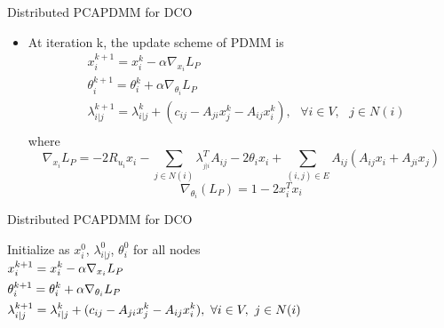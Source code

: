 \documentclass{beamer}
\begin{document}
\begin{frame}{Distributed PCA}{PDMM for DCO}
\begin{itemize}
\item{
At iteration k, the update scheme of PDMM is
\begin{equation}
\begin{align}
  & x_{i}^{k+1}=x_{i}^{k}-\alpha {{\nabla }_{{{x}_{i}}}}{{L}_{P}} \\ 
 & \theta _{i}^{k+1}=\theta _{i}^{k}+\alpha {{\nabla }_{{{\theta }_{i}}}}{{L}_{P}} \\ 
 & \lambda _{i|j}^{k+1}=\lambda _{i|j}^{k}+({{c}_{ij}}-{{A}_{ji}}x_{j}^{k}-{{A}_{ij}}x_{i}^{k}),\text{ }\forall i\in V,\text{ }j\in N(i) \\ 
\end{align}
\end{equation}
where
\begin{equation}
{{\nabla }_{{{x}_{i}}}}{{L}_{P}}=-2{{R}_{{{u}_{i}}}}{{x}_{i}}-\sum\limits_{j\in N(i)}{\lambda _{_{j|i}}^{T}{{A}_{ij}}}-2{{\theta }_{i}}{{x}_{i}}+\sum\limits_{(i,j)\in E}{{{A}_{ij}}({{A}_{ij}}{{x}_{i}}+{{A}_{ji}}{{x}_{j}})}
\end{equation}
\begin{equation}
 {{\nabla }_{{{\theta }_{i}}}}({{L}_{P}})=1-2x_{i}^{T}{{x}_{i}}
\end{equation}
}
\end{itemize}
\end{frame}

			
\begin{frame}{Distributed PCA}{PDMM for DCO}
			\begin{algorithm}[H]
			\begin{algorithmic}[1]
			\STATE  Initialize as $ x_{i}^{0} $, $\lambda _{i|j}^{0}$, $ \theta _{i}^{0}$ for all nodes		
			\STATE 	$\begin{gathered}
  x_i^{k + 1} = x_i^k - \alpha {\nabla _{{x_i}}}{L_P} \hfill \\
  \theta _i^{k + 1} = \theta _i^k + \alpha {\nabla _{{\theta _i}}}{L_P} \hfill \\
  \lambda _{i|j}^{k + 1} = \lambda _{i|j}^k + ({c_{ij}} - {A_{ji}}x_j^k - {A_{ij}}x_i^k),{\text{ }}\forall i \in V,{\text{ }}j \in N(i) \hfill \\ 
\end{gathered} $		\ENDFOR
			\ENDFOR
			\end{algorithmic}
			\caption{PDMM}
			\label{alg:1}
			\end{algorithm}

\end{frame}
\end{document}
